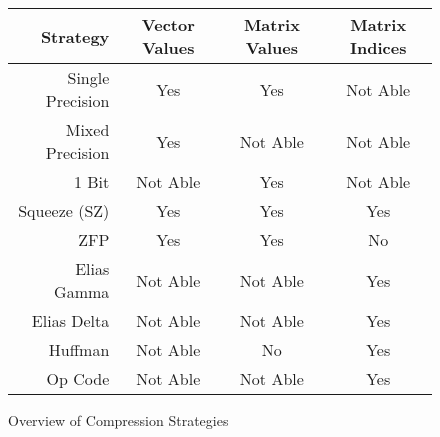\begin{figure}
	\centering
	\begin{tabular}{r| c c c}
		Strategy & Vector Values & Matrix Values & Matrix Indices \\
		\hline
		Single Precision & Yes & Yes & Not Able \\
		Mixed Precision & Yes & Not Able & Not Able \\
		1 Bit & Not Able & Yes & Not Able \\
		Squeeze (SZ) & Yes & Yes & Yes \\
		ZFP & Yes & Yes & No \\
		Elias Gamma & Not Able & Not Able & Yes \\
		Elias Delta & Not Able & Not Able & Yes \\
		Huffman & Not Able & No & Yes \\
		Op Code & Not Able & Not Able & Yes
	\end{tabular}
	
	\caption{Overview of Compression Strategies}
	\label{fig:comp-overview}
\end{figure}